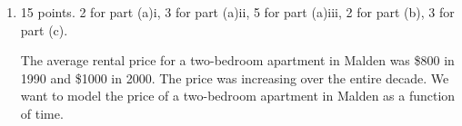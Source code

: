 \documentclass{article}
\begin{document}
\begin{enumerate}
\begin{enumerate}
    \item 
    \begin{problem}
    Given the graph of $y=\sin^2x$ shown, rewrite $\sin^2x$ in sinusoidal form.
    \end{problem}
    
    \vspace{16pt}
    $\sin^2x=\solonly{\boxed{-\frac{1}{2}\cos(2x)+\frac{1}{2}}}$ 
    \vspace{16pt}
    
    \item
    \begin{problem}
    Given the graph of $y=\cos^2x$ shown, rewrite $\cos^2x$ in sinusoidal form.
    \end{problem}
    
    \vspace{16pt}
    $\cos^2x=\solonly{\boxed{\frac{1}{2}\cos(2x)+\frac{1}{2}}}$ 
    \vspace{16pt}

\end{enumerate}


\pspace{\newpage}




\item 


\begin{grading}
15 points. 2 for part (a)i, 3 for part (a)ii, 5 for part (a)iii, 2 for part (b), 3 for part (c).
\end{grading}

  The average rental price for a two-bedroom apartment in Malden was \$800
  in 1990 and \$1000 in 2000. The price was increasing over the entire
  decade. We want to model the price of a two-bedroom apartment in Malden
  as a function of time.



\end{enumerate}
\end{document}
